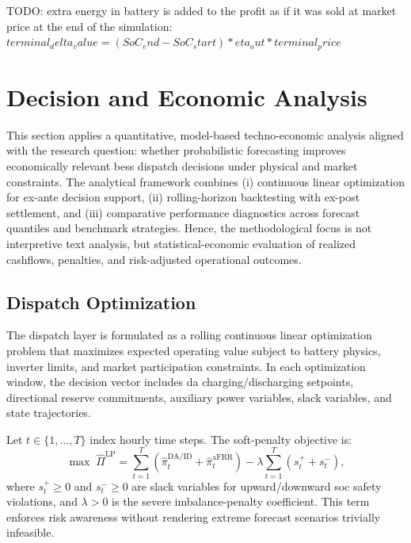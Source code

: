 
TODO: extra energy in battery is added to the profit as if it was sold at market price at the end of the simulation: $terminal_delta_value = (SoC_end - SoC_start) * eta_out * terminal_price$

\section{Decision and Economic Analysis}
This section applies a quantitative, model-based techno-economic analysis aligned with the research question: whether probabilistic forecasting improves economically relevant \gls{bess} dispatch decisions under physical and market constraints. The analytical framework combines (i) continuous linear optimization for ex-ante decision support, (ii) rolling-horizon backtesting with ex-post settlement, and (iii) comparative performance diagnostics across forecast quantiles and benchmark strategies. Hence, the methodological focus is not interpretive text analysis, but statistical-economic evaluation of realized cashflows, penalties, and risk-adjusted operational outcomes.

\subsection{Dispatch Optimization}
\label{subsec:dispatch-optimization}
The dispatch layer is formulated as a rolling continuous linear optimization problem that maximizes expected operating value subject to battery physics, inverter limits, and market participation constraints. In each optimization window, the decision vector includes \gls{da} charging/discharging setpoints, directional reserve commitments, auxiliary power variables, slack variables, and state trajectories.

Let $t\in\{1,\dots,T\}$ index hourly time steps. The soft-penalty objective is:
\begin{equation}\label{eq:milp-objective-soft}
    \max \; \hat{\Pi}^{\mathrm{LP}}
    =
    \sum_{t=1}^{T}\left(\hat{\pi}_{t}^{\mathrm{DA/ID}}+\hat{\pi}_{t}^{\mathrm{aFRR}}\right)
    - \lambda \sum_{t=1}^{T}\left(s_{t}^{+}+s_{t}^{-}\right),
\end{equation}
where $s_t^+\ge 0$ and $s_t^-\ge 0$ are slack variables for upward/downward \gls{soc} safety violations, and $\lambda>0$ is the severe imbalance-penalty coefficient. This term enforces risk awareness without rendering extreme forecast scenarios trivially infeasible.

